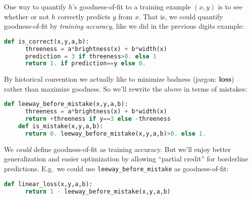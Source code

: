   One way to quantify $h$'s goodness-of-fit to a training example $(x,y)$ is to
  see whether or not $h$ correctly predicts $y$ from $x$.  That is, we could
  quantify goodness-of-fit by \emph{training accuracy}, like we did in the
  previous digits example:
  \begin{lstlisting}[language=Python, basicstyle=\footnotesize\ttfamily]
    def is_correct(x,y,a,b):
      threeness = a*brightness(x) + b*width(x)
      prediction = 3 if threeness>0. else 1
      return 1. if prediction==y else 0.
  \end{lstlisting}
  By historical convention we actually like
  to minimize badness (jargon: \textbf{loss}) rather than
  maximize goodness.  So we'll rewrite the above in terms of mistakes:
  \begin{lstlisting}[language=Python, basicstyle=\footnotesize\ttfamily]
    def leeway_before_mistake(x,y,a,b):
      threeness = a*brightness(x) + b*width(x)
      return +threeness if y==3 else -threeness
    def is_mistake(x,y,a,b):
      return 0. leeway_before_mistake(x,y,a,b)>0. else 1.
  \end{lstlisting}

  We \emph{could} define goodness-of-fit as training accuracy.  But we'll enjoy
  better generalization and easier optimization by allowing ``partial credit''
  for borderline predictions.
  E.g.\ we could use \texttt{leeway\_before\_mistake} as goodness-of-fit:
  \begin{lstlisting}[language=Python, basicstyle=\footnotesize\ttfamily]
    def linear_loss(x,y,a,b):
      return 1 - leeway_before_mistake(x,y,a,b)
  \end{lstlisting}

